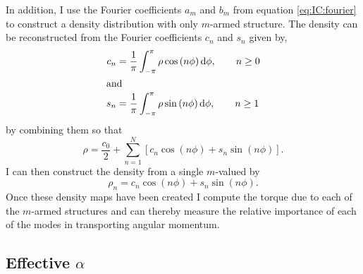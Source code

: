 In addition, I use the Fourier coefficients $a_m$ and $b_m$ from equation \eqref{eq:IC:fourier} to construct a density distribution with only $m$-armed structure. The density can be reconstructed from the Fourier coefficients $c_n$ and $s_n$ given by,
\begin{subequations}
\begin{align}
c_n &= \frac{1}{\pi} \int_{-\pi}^\pi \rho \cos\left(n\phi \right) \mathrm{d} \phi, \qquad n \geq 0\\
\intertext{and}
s_n &= \frac{1}{\pi} \int_{-\pi}^\pi \rho \sin\left(n\phi \right) \mathrm{d} \phi, \qquad n \geq 1
\end{align}
\end{subequations}
by combining them so that
\begin{equation}
\rho = \frac{c_0}{2} + \sum_{n=1}^{N} \left[ c_n \cos \left( n \phi \right) + s_n \sin \left( n \phi \right) \right].
\end{equation}
I can then construct the density from a single $m$-valued by
\begin{equation}
\rho_n = c_n \cos(n\phi) + s_n \sin(n\phi).
\end{equation}
Once these density maps have been created I compute the torque due to each of the $m$-armed structures and can thereby measure the relative importance of each of the modes in transporting angular momentum. 

\subsection{Effective $\alpha$}\label{sec:IC:alphadisk}

